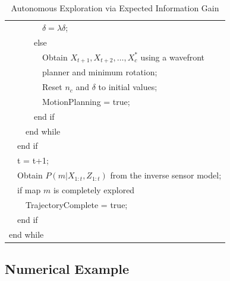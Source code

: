 \documentclass[letterpaper, 10pt]{ieeeconf}
\newcommand{\braces}[1]{\ensuremath{\left\{ #1 \right\}}}
\newcommand{\argmin}{\operatornamewithlimits{argmin}}
\newcommand{\argmax}{\operatornamewithlimits{argmax}}
\begin{document}
\begin{table}
\begin{tabular}{ l }
  \ \ \ \ \ \ \ \ $\delta=\lambda \delta$;\\
  \ \ \ \ \ \ else\\
  \ \ \ \ \ \ \ \ Obtain $X_{t+1},X_{t+2},\ldots,X_{c}^*$ using a wavefront\\  \ \ \ \ \ \ \ \ planner and minimum rotation;\\
  \ \ \ \ \ \ \ \ Reset $n_c$ and $\delta$ to initial values;\\
  \ \ \ \ \ \ \ \ MotionPlanning = true;\\  
  \ \ \ \ \ \ end if\\
  \ \ \ \ end while\\
  \ \ end if\\
  \ \ t = t+1;\\
  \ \ Obtain $P(m|X_{1:t},Z_{1:t})$ from the inverse sensor model;\\
  \ \ if map $m$ is completely explored\\
  \ \ \ \ TrajectoryComplete = true;\\
  \ \ end if\\
  end while


\end{tabular}
\caption{Autonomous Exploration via Expected Information Gain}
\label{tab:Alg_AutomousExploration}
\end{table}



\subsection{Numerical Example}
\end{document}
